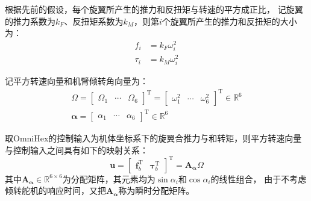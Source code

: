 根据先前的假设，每个旋翼所产生的推力和反扭矩与转速的平方成正比，
记旋翼的推力系数为$k_F$、反扭矩系数为$k_M$，则第$i$个旋翼所产生的推力和反扭矩的大小为：
\begin{align}
    f_i &= k_F\omega_i^2 \label{equ:thrust_i}\\
    \tau_i &= k_M\omega_i^2\label{equ:drag_i}
\end{align}

记平方转速向量和机臂倾转角向量为：
\begin{gather}
    \bm{\varOmega} = 
    \begin{bmatrix}
        \varOmega_1 & \cdots & \varOmega_6
    \end{bmatrix}^{\text{T}} = 
    \begin{bmatrix}
        \omega_1^2 & \cdots & \omega_6^2
    \end{bmatrix}^{\text{T}} \in \mathbb{R}^6 \label{equ:square_rotate_speed_vector}\\
    \bm{\alpha} = 
    \begin{bmatrix}
        \alpha_1 & \cdots & \alpha_6
    \end{bmatrix}^{\text{T}} \in \mathbb{R}^6 \label{equ:tilt_angle_vector}
\end{gather}

取OmniHex的控制输入为机体坐标系下的旋翼合推力与和转矩，则平方转速向量与控制输入之间具有如下的映射关系：
\begin{equation}
    \bm{u} = 
    \begin{bmatrix}
        \bm{f}_b^{\text{T}} & \bm{\tau}_b^{\text{T}}
    \end{bmatrix}^{\text{T}} =
    \bm{A}_{\bm{\alpha}}\bm{\varOmega}
    \label{equ:instantaneous_allocation_matrix}
\end{equation}
其中$\bm{A}_{\bm{\alpha}} \in \mathbb{R}^{6\times6}$为分配矩阵，其元素均为$\sin\alpha_i$和$\cos\alpha_i$的线性组合，
由于不考虑倾转舵机的响应时间，又把$\bm{A}_{\bm{\alpha}}$称为瞬时分配矩阵\cite{bodie2018towards}。

